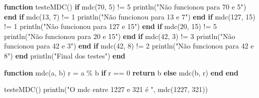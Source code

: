 \documentclass[
  letterpaper,
  DIV=11,
  numbers=noendperiod]{scrreprt}
\newenvironment{Shaded}{\begin{snugshade}}{\end{snugshade}}
\newcommand{\ControlFlowTok}[1]{\textcolor[rgb]{0.00,0.23,0.31}{\textbf{#1}}}
\newcommand{\FloatTok}[1]{\textcolor[rgb]{0.68,0.00,0.00}{#1}}
\newcommand{\FunctionTok}[1]{\textcolor[rgb]{0.28,0.35,0.67}{#1}}
\newcommand{\KeywordTok}[1]{\textcolor[rgb]{0.00,0.23,0.31}{\textbf{#1}}}
\newcommand{\NormalTok}[1]{\textcolor[rgb]{0.00,0.23,0.31}{#1}}
\newcommand{\OperatorTok}[1]{\textcolor[rgb]{0.37,0.37,0.37}{#1}}
\newcommand{\StringTok}[1]{\textcolor[rgb]{0.13,0.47,0.30}{#1}}
\begin{document}
\begin{Shaded}
\begin{Highlighting}[]
\KeywordTok{function} \FunctionTok{testeMDC}\NormalTok{()}
    \ControlFlowTok{if} \FunctionTok{mdc}\NormalTok{(}\FloatTok{70}\NormalTok{, }\FloatTok{5}\NormalTok{) }\OperatorTok{!=} \FloatTok{5}
        \FunctionTok{println}\NormalTok{(}\StringTok{"Não funcionou para 70 e 5"}\NormalTok{)}
    \ControlFlowTok{end}
    \ControlFlowTok{if} \FunctionTok{mdc}\NormalTok{(}\FloatTok{13}\NormalTok{, }\FloatTok{7}\NormalTok{) }\OperatorTok{!=} \FloatTok{1}
        \FunctionTok{println}\NormalTok{(}\StringTok{"Não funcionou para 13 e 7"}\NormalTok{)}
    \ControlFlowTok{end}
    \ControlFlowTok{if} \FunctionTok{mdc}\NormalTok{(}\FloatTok{127}\NormalTok{, }\FloatTok{15}\NormalTok{) }\OperatorTok{!=} \FloatTok{1}
        \FunctionTok{println}\NormalTok{(}\StringTok{"Não funcionou para 127 e 15"}\NormalTok{)}
    \ControlFlowTok{end}
    \ControlFlowTok{if} \FunctionTok{mdc}\NormalTok{(}\FloatTok{20}\NormalTok{, }\FloatTok{15}\NormalTok{) }\OperatorTok{!=} \FloatTok{5}
        \FunctionTok{println}\NormalTok{(}\StringTok{"Não funcionou para 20 e 15"}\NormalTok{)}
    \ControlFlowTok{end}
    \ControlFlowTok{if} \FunctionTok{mdc}\NormalTok{(}\FloatTok{42}\NormalTok{, }\FloatTok{3}\NormalTok{) }\OperatorTok{!=} \FloatTok{3}
        \FunctionTok{println}\NormalTok{(}\StringTok{"Não funcionou para 42 e 3"}\NormalTok{)}
    \ControlFlowTok{end}
    \ControlFlowTok{if} \FunctionTok{mdc}\NormalTok{(}\FloatTok{42}\NormalTok{, }\FloatTok{8}\NormalTok{) }\OperatorTok{!=} \FloatTok{2}
        \FunctionTok{println}\NormalTok{(}\StringTok{"Não funcionou para 42 e 8"}\NormalTok{)}
    \ControlFlowTok{end}
    \FunctionTok{println}\NormalTok{(}\StringTok{"Final dos testes"}\NormalTok{)}
\KeywordTok{end}

\KeywordTok{function} \FunctionTok{mdc}\NormalTok{(a, b)}
\NormalTok{    r }\OperatorTok{=}\NormalTok{ a }\OperatorTok{\%}\NormalTok{ b}
    \ControlFlowTok{if}\NormalTok{ r }\OperatorTok{==} \FloatTok{0}
        \ControlFlowTok{return}\NormalTok{ b}
    \ControlFlowTok{else}
        \FunctionTok{mdc}\NormalTok{(b, r)}
    \ControlFlowTok{end}
\KeywordTok{end}

\FunctionTok{testeMDC}\NormalTok{()}
\FunctionTok{println}\NormalTok{(}\StringTok{"O mdc entre 1227 e 321 é "}\NormalTok{, }\FunctionTok{mdc}\NormalTok{(}\FloatTok{1227}\NormalTok{, }\FloatTok{321}\NormalTok{))}
\end{Highlighting}
\end{Shaded}
\end{document}
